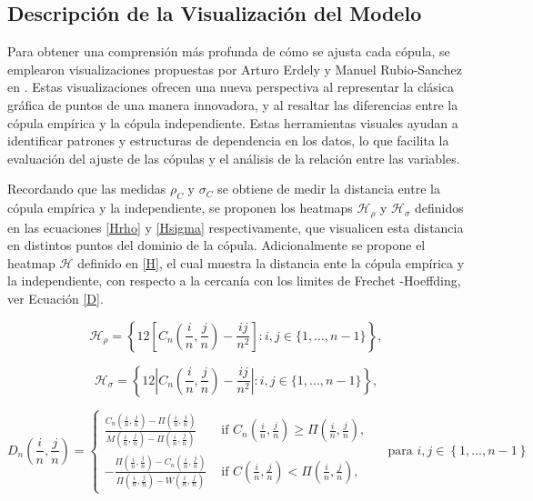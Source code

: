 
\subsection{Descripción de la Visualización del Modelo}

Para obtener una comprensión más profunda de cómo se ajusta cada cópula, se emplearon visualizaciones propuestas por Arturo Erdely y Manuel Rubio-Sanchez en \cite{Erdely2022}. Estas visualizaciones ofrecen una nueva perspectiva al representar la clásica gráfica de puntos de una manera innovadora, y al resaltar las diferencias entre la cópula empírica y la cópula independiente. Estas herramientas visuales ayudan a identificar patrones y estructuras de dependencia en los datos, lo que facilita la evaluación del ajuste de las cópulas y el análisis de la relación entre las variables.

Recordando que las medidas $\rho_C$ y $\sigma_C$ se obtiene de medir la distancia entre la cópula empírica y la independiente, se proponen los heatmaps $\mathscr{H}_\rho$ y $\mathscr{H}_\sigma$ definidos en las ecuaciones \eqref{Hrho} y \eqref{Hsigma} respectivamente, que visualicen esta distancia en distintos puntos del dominio de la cópula. Adicionalmente se propone el heatmap $\mathscr{H}$ definido en \eqref{H}, el cual muestra la distancia ente la cópula empírica y la independiente, con respecto a la cercanía con los limites de Frechet -Hoeffding, ver Ecuación \eqref{D}.

\begin{equation}\label{Hrho}
    \mathscr{H}_\rho=\left\{12\left[C_n\left(\frac{i}{n}, \frac{j}{n}\right)-\frac{i j}{n^2}\right]: i, j \in\{1, \ldots, n-1\}\right\},
\end{equation}

\begin{equation}\label{Hsigma}
    \mathscr{H}_\sigma = \left\{12\left|C_n\left( \frac{i}{n}, \frac{j}{n}\right)-\frac{i j}{n^2}\right|: i, j \in\{1, \ldots, n-1\}\right\},
\end{equation}


\begin{equation}\label{D}
    D_n\left(\frac{i}{n}, \frac{j}{n}\right)=\left\{\begin{array}{cc}
\frac{C_n\left(\frac{i}{n}, \frac{j}{n}\right)-\Pi\left(\frac{i}{n}, \frac{j}{n}\right)}{M\left(\frac{i}{n}, \frac{j}{n}\right)-\Pi\left(\frac{i}{n}, \frac{j}{n}\right)} & \text { if } C_n\left(\frac{i}{n}, \frac{j}{n}\right) \geq \Pi\left(\frac{i}{n}, \frac{j}{n}\right), \\
-\frac{\Pi\left(\frac{i}{n}, \frac{j}{n}\right)-C_n\left(\frac{i}{n}, \frac{j}{n}\right)}{\Pi\left(\frac{i}{n}, \frac{j}{n}\right)-W\left(\frac{i}{n}, \frac{j}{n}\right)} & \text { if } C\left(\frac{i}{n}, \frac{j}{n}\right)<\Pi\left(\frac{i}{n}, \frac{j}{n}\right),
\end{array}\right. \quad \text{ para } i,j \in  \left\{ 1, \dots, n-1 \right\} 
\end{equation}

